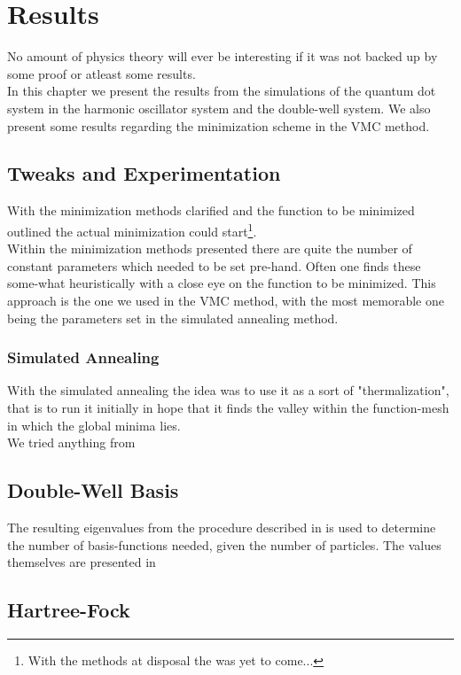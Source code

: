 \chapter{Results \label{chapter:6}}
    No amount of physics theory will ever be interesting if it was not backed
    up by some proof or atleast some results. \\
    In this chapter we present the results from the simulations of the quantum
    dot system in the harmonic oscillator system and the double-well system. We
    also present some results regarding the minimization scheme in the VMC
    method.

\section{Tweaks and Experimentation}
    With the minimization methods clarified and the function to be minimized
    outlined the actual minimization could start\footnote{With the methods at
    disposal the  was yet to come...}. \\
    Within the minimization methods presented there are quite the number of
    constant parameters which needed to be set pre-hand. Often one finds these
    some-what heuristically with a close eye on the function to be minimized.
    This approach is the one we used in the VMC method, with the most memorable
    one being the parameters set in the simulated annealing method.

\subsection{Simulated Annealing}
    With the simulated annealing the idea was to use it as a sort of
    "thermalization", that is to run it initially in hope that it finds the
    valley within the function-mesh in which the global minima lies. \\
    We tried anything from 

\section{Double-Well Basis}
    The resulting eigenvalues from the procedure described in 
    is used to determine the number of basis-functions needed, given the number
    of particles. The values themselves are presented in
    

\section{Hartree-Fock}
    
    

